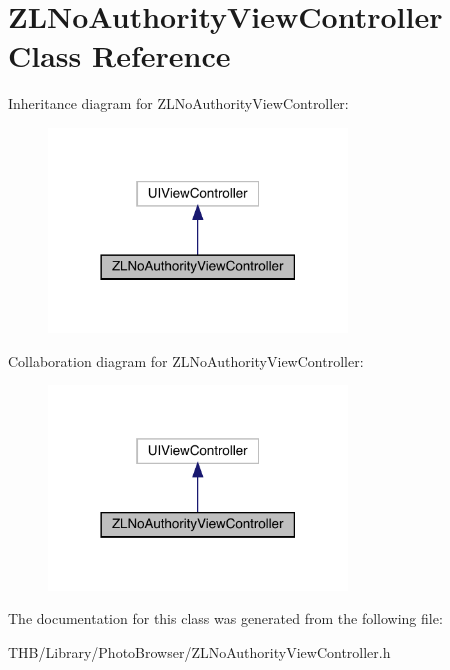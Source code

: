 \hypertarget{interface_z_l_no_authority_view_controller}{}\section{Z\+L\+No\+Authority\+View\+Controller Class Reference}
\label{interface_z_l_no_authority_view_controller}


Inheritance diagram for Z\+L\+No\+Authority\+View\+Controller\+:\nopagebreak
\begin{figure}[H]
\begin{center}
\leavevmode
\includegraphics[width=225pt]{interface_z_l_no_authority_view_controller__inherit__graph}
\end{center}
\end{figure}


Collaboration diagram for Z\+L\+No\+Authority\+View\+Controller\+:\nopagebreak
\begin{figure}[H]
\begin{center}
\leavevmode
\includegraphics[width=225pt]{interface_z_l_no_authority_view_controller__coll__graph}
\end{center}
\end{figure}


The documentation for this class was generated from the following file\+:\begin{DoxyCompactItemize}
\item 
T\+H\+B/\+Library/\+Photo\+Browser/Z\+L\+No\+Authority\+View\+Controller.\+h\end{DoxyCompactItemize}
